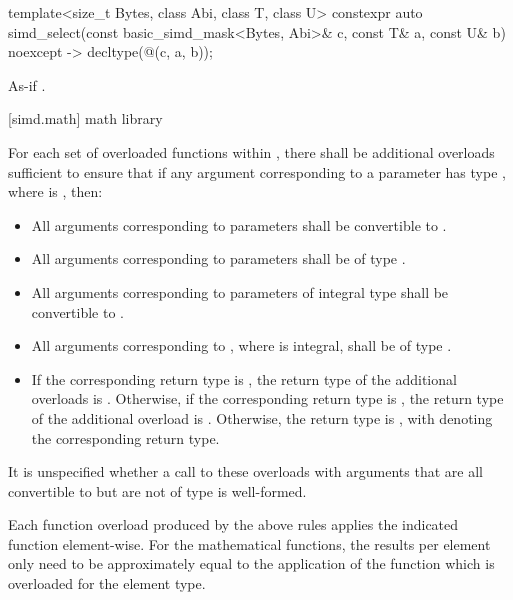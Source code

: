 \begin{itemdecl}
  template<size_t Bytes, class Abi, class T, class U>
    constexpr auto simd_select(const basic_simd_mask<Bytes, Abi>& c, const T& a, const U& b)
    noexcept -> decltype(@\simdselect@(c, a, b));
\end{itemdecl}

\begin{itemdescr}
    \pnum\returns As-if .
\end{itemdescr}

[simd.math]{ math library}

\pnum
For each set of overloaded functions within , there shall be additional overloads sufficient to ensure that if any argument corresponding to a  parameter has type , where  is , then:
\begin{itemize}
  \item All arguments corresponding to  parameters shall be convertible to .
  \item All arguments corresponding to  parameters shall be of type .
  \item All arguments corresponding to parameters of integral type  shall be convertible to .
  \item All arguments corresponding to , where  is integral, shall be of type .
  \item If the corresponding return type is , the return type of the additional overloads is . Otherwise, if the corresponding return type is , the return type of the additional overload is . Otherwise, the return type is , with  denoting the corresponding return type.
\end{itemize}
It is unspecified whether a call to these overloads with arguments that are all convertible to  but are not of type  is well-formed.

\pnum
Each function overload produced by the above rules applies the indicated  function element-wise. For the mathematical functions, the results per element only need to be approximately equal to the application of the function which is overloaded for the element type.

